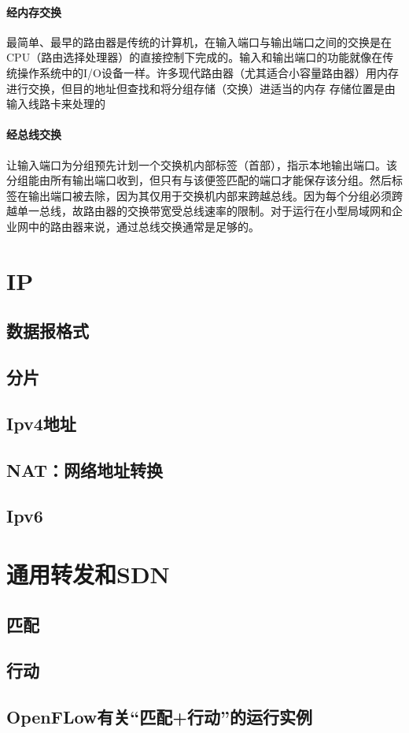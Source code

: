 \documentclass[]{report}
\begin{document}
			\paragraph{经内存交换}
			最简单、最早的路由器是传统的计算机，在输入端口与输出端口之间的交换是在CPU（路由选择处理器）的直接控制下完成的。输入和输出端口的功能就像在传统操作系统中的I/O设备一样。许多现代路由器（尤其适合小容量路由器）用内存进行交换，但目的地址但查找和将分组存储（交换）进适当的内存 存储位置是由输入线路卡来处理的
			\paragraph{经总线交换}
			让输入端口为分组预先计划一个交换机内部标签（首部），指示本地输出端口。该分组能由所有输出端口收到，但只有与该便签匹配的端口才能保存该分组。然后标签在输出端口被去除，因为其仅用于交换机内部来跨越总线。因为每个分组必须跨越单一总线，故路由器的交换带宽受总线速率的限制。对于运行在小型局域网和企业网中的路由器来说，通过总线交换通常是足够的。
	\section{IP}
		\subsection{数据报格式}
		\subsection{分片}
		\subsection{Ipv4地址}
		\subsection{NAT：网络地址转换}
		\subsection{Ipv6}
	\section{通用转发和SDN}
		\subsection{匹配}
		\subsection{行动}
		\subsection{OpenFLow有关“匹配+行动”的运行实例}
\end{document}
